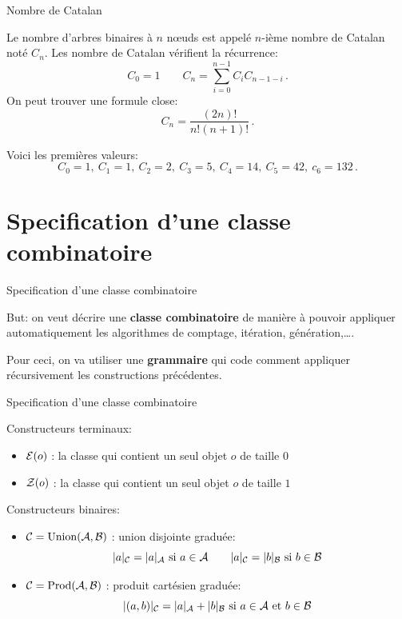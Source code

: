 \documentclass{beamer}
\begin{document}
\begin{frame}{Nombre de Catalan}
  \begin{PROP}
    Le nombre d'arbres binaires à $n$ n\oe uds est appelé $n$-ième nombre de
    Catalan noté $C_n$. Les nombre de Catalan vérifient la récurrence:
    \begin{equation*}
      C_0=1\qquad C_n = \sum_{i=0}^{n-1} C_i C_{n-1-i}\,.
    \end{equation*}
    On peut trouver une formule close:
    \begin{equation*}
      C_n = \frac{(2n)!}{n!(n+1)!}\,.
    \end{equation*}
  \end{PROP}
  Voici les premières valeurs:
  \[C_0=1,\ C_1=1,\ C_2=2,\ C_3=5,\ C_4=14,\ C_5=42,\ c_6=132\,.\]
\end{frame}

\section{Specification d'une classe combinatoire}
\begin{frame}{Specification d'une classe combinatoire}

  But: on veut décrire une \textbf{classe combinatoire} de manière à pouvoir
  appliquer automatiquement les algorithmes de comptage, itération,
  génération,\dots.
  \bigskip

  Pour ceci, on va utiliser une \textbf{grammaire} qui code comment appliquer
  récursivement les constructions précédentes.
\end{frame}

\begin{frame}{Specification d'une classe combinatoire}
\begin{NOTE}
  Constructeurs terminaux:
  \begin{itemize}
  \item $\mathcal{E}(o)$ : la classe qui contient un seul objet $o$ de taille $0$
  \item $\mathcal{Z}(o)$ : la classe qui contient un seul objet $o$ de taille $1$
  \end{itemize}
  Constructeurs binaires:
  \begin{itemize}
  \item $\mathcal{C} = \operatorname{Union}(\mathcal{A}, \mathcal{B})$ : union disjointe graduée:
    \[|a|_\mC = |a|_\mA\ \text{si $a\in\mA$}\qquad
      |a|_\mC = |b|_\mB\ \text{si $b\in\mB$}\]
  \item $\mathcal{C} = \operatorname{Prod}(\mathcal{A}, \mathcal{B})$ : produit cartésien graduée:
    \[|(a, b)|_{\mathcal{C}} = |a|_{\mathcal{A}} + |b|_{\mathcal{B}}\ \text{si $a\in\mathcal{A}$ et $b\in\mathcal{B}$}\]
  \end{itemize}
\end{NOTE}
\end{frame}
\end{document}
